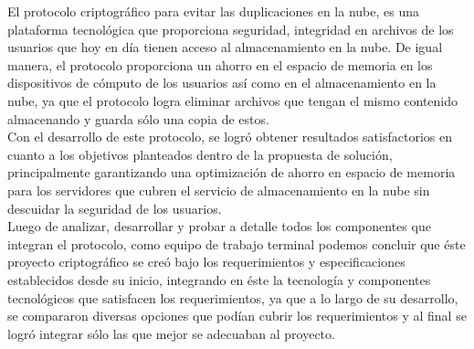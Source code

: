 
El protocolo criptográfico para evitar las duplicaciones en la nube, es una plataforma tecnológica que proporciona seguridad, integridad en archivos de los usuarios que hoy en día tienen acceso al almacenamiento en la nube. De igual manera, el protocolo proporciona un ahorro en el espacio de memoria en los dispositivos de cómputo de los usuarios así como en el almacenamiento en la nube, ya que el protocolo logra eliminar archivos que tengan el mismo contenido almacenando y guarda sólo una copia de estos. \\
Con el desarrollo de este protocolo, se logró obtener resultados satisfactorios en cuanto a los objetivos planteados dentro de la propuesta de solución, principalmente garantizando una optimización de ahorro en espacio de memoria para los servidores que cubren el servicio de almacenamiento en la nube sin descuidar la seguridad de los usuarios. \\
Luego de analizar, desarrollar y probar a detalle todos los componentes que integran el protocolo, como equipo de trabajo terminal podemos concluir que éste proyecto criptográfico se creó bajo los requerimientos y especificaciones establecidos desde su inicio, integrando en éste la tecnología y componentes tecnológicos que satisfacen los requerimientos, ya que a lo largo de su desarrollo, se compararon diversas opciones que podían cubrir los requerimientos y al final se logró integrar sólo las que mejor se adecuaban al proyecto. 



